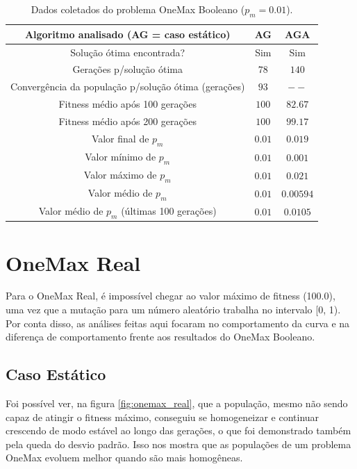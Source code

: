 \begin{table}
\caption{Dados coletados do problema OneMax Booleano ($p_m = 0.01$).}
\label{tab:onemax_boolean}

\center
\begin{tabular}{|c|cc|}
	\hline
	Algoritmo analisado (AG = caso estático)				& AG		& AGA		\\
	\hline
	Solução ótima encontrada?								& Sim		& Sim		\\
	Gerações p/solução ótima								& $78$		& $140$		\\
	Convergência da população p/solução ótima (gerações)	& $93$		& $--$		\\
	Fitness médio após 100 gerações							& $100$		& $82.67$	\\
	Fitness médio após 200 gerações 						& $100$		& $99.17$	\\
	Valor final de $p_m$									& $0.01$ 	& $0.019$	\\
	Valor mínimo de $p_m$									& $0.01$	& $0.001$	\\
	Valor máximo de $p_m$									& $0.01$	& $0.021$	\\
	Valor médio de $p_m$									& $0.01$	& $0.00594$	\\
	Valor médio de $p_m$ (últimas 100 gerações)				& $0.01$	& $0.0105$	\\
	\hline
\end{tabular}
\end{table}

\section{OneMax Real}

Para o OneMax Real, é impossível chegar ao valor máximo de fitness (100.0), uma vez que a mutação para um número aleatório trabalha no intervalo [0, 1). Por conta disso, as análises feitas aqui focaram no comportamento da curva e na diferença de comportamento frente aos resultados do OneMax Booleano.

\subsection{Caso Estático}

Foi possível ver, na figura \ref{fig:onemax_real}, que a população, mesmo não sendo capaz de atingir o fitness máximo, conseguiu se homogeneizar e continuar crescendo de modo estável ao longo das gerações, o que foi demonstrado também pela queda do desvio padrão. Isso nos mostra que as populações de um problema OneMax evoluem melhor quando são mais homogêneas.

